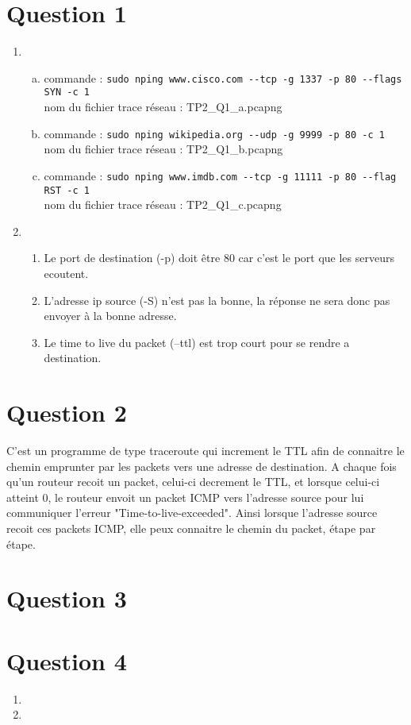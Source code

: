 
\section{Question 1}
\begin{enumerate}
	\item 
	\begin{enumerate}[a)]
		\item 
			commande : \verb!sudo nping www.cisco.com --tcp -g 1337 -p 80 --flags SYN -c 1!\\
			nom du fichier trace réseau : TP2\_Q1\_a.pcapng
		\item 
			commande : \verb!sudo nping wikipedia.org --udp -g 9999 -p 80 -c 1!\\
			nom du fichier trace réseau : TP2\_Q1\_b.pcapng
		\item 
			commande : \verb!sudo nping www.imdb.com --tcp -g 11111 -p 80 --flag RST -c 1!\\
			nom du fichier trace réseau : TP2\_Q1\_c.pcapng
	\end{enumerate}
	\item 
		\begin{enumerate}
			\item
				Le port de destination (-p) doit être 80 
				car c'est le port que les serveurs ecoutent.
			\item
				L'adresse ip source (-S) n'est pas la bonne,
				la réponse ne sera donc pas envoyer à la bonne
				adresse.
			\item
				Le time to live du packet (--ttl) est trop court
				pour se rendre a destination.
		\end{enumerate}
\end{enumerate}

\section{Question 2}
C'est un programme de type traceroute qui increment le TTL afin
de connaitre le chemin emprunter par les packets vers 
une adresse de destination. A chaque fois qu'un routeur recoit
un packet, celui-ci decrement le TTL, et lorsque celui-ci atteint 0,
le routeur envoit un packet ICMP vers l'adresse source pour lui
communiquer l'erreur "Time-to-live-exceeded". Ainsi lorsque l'adresse
source recoit ces packets ICMP, elle peux connaitre le chemin du
packet, étape par étape.

\section{Question 3}

\section{Question 4}
\begin{enumerate}
	\item 
	\item 
\end{enumerate}

